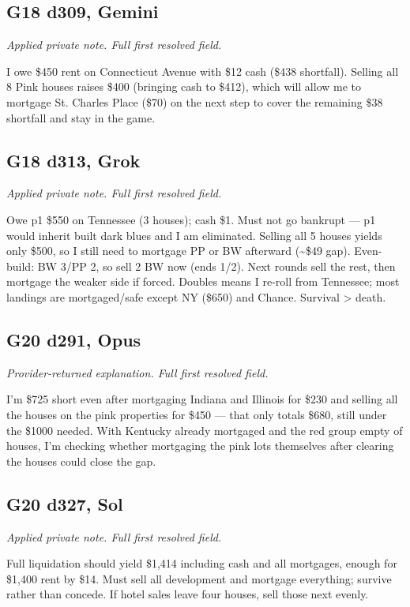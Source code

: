 \subsection*{G18 d309, Gemini}
{\small\textit{Applied private note. Full first resolved field.}\par I owe \$450 rent on Connecticut Avenue with \$12 cash (\$438 shortfall). Selling all 8 Pink houses raises \$400 (bringing cash to \$412), which will allow me to mortgage St. Charles Place (\$70) on the next step to cover the remaining \$38 shortfall and stay in the game.\par}
\subsection*{G18 d313, Grok}
{\small\textit{Applied private note. Full first resolved field.}\par Owe p1 \$550 on Tennessee (3 houses); cash \$1. Must not go bankrupt — p1 would inherit built dark blues and I am eliminated. Selling all 5 houses yields only \$500, so I still need to mortgage PP or BW afterward (\textasciitilde{}\$49 gap). Even-build: BW 3/PP 2, so sell 2 BW now (ends 1/2). Next rounds sell the rest, then mortgage the weaker side if forced. Doubles means I re-roll from Tennessee; most landings are mortgaged/safe except NY (\$650) and Chance. Survival > death.\par}
\subsection*{G20 d291, Opus}
{\small\textit{Provider-returned explanation. Full first resolved field.}\par I'm \$725 short even after mortgaging Indiana and Illinois for \$230 and selling all the houses on the pink properties for \$450 — that only totals \$680, still under the \$1000 needed. With Kentucky already mortgaged and the red group empty of houses, I'm checking whether mortgaging the pink lots themselves after clearing the houses could close the gap.\par}
\subsection*{G20 d327, Sol}
{\small\textit{Applied private note. Full first resolved field.}\par Full liquidation should yield \$1,414 including cash and all mortgages, enough for \$1,400 rent by \$14. Must sell all development and mortgage everything; survive rather than concede. If hotel sales leave four houses, sell those next evenly.\par}
